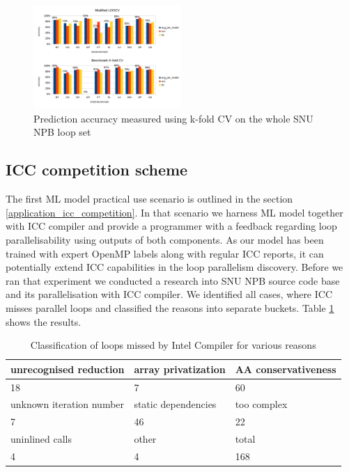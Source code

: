 \documentclass[sigconf,10pt,review,anonymous]{acmart}
\begin{document}
\begin{figure}[h]
\includegraphics[width=0.5\textwidth]{figures/LOOCV_accuracy.pdf}
\caption{Prediction accuracy measured using k-fold CV on the whole SNU NPB loop set}
\label{fig:accuracy}
\end{figure}

\subsection{ICC competition scheme}
\label{evaluation_icc_competition}
\quad The first ML model practical use scenario is outlined in the section \ref{application_icc_competition}. In that scenario we harness ML model together with ICC compiler and provide a programmer with a feedback regarding loop parallelisability using outputs of both components. As our model has been trained with expert OpenMP labels along with regular ICC reports, it can potentially extend ICC capabilities in the loop parallelism discovery.\newline\null
\quad Before we ran that experiment we conducted a research into SNU NPB source code base and its parallelisation with ICC compiler. We identified all cases, where ICC misses parallel loops and classified the reasons into separate buckets. Table \ref{tab:icc_missed_opportunities} shows the results.

\begin{table}[h!]
    \centering
    \begin{tabular}[c]{|p{2cm}|p{2cm}|p{2cm}|}
        \hline
        unrecognised reduction & array privatization & AA conservativeness \\
        \hline
        18 & 7 & 60 \\
        \hline
        unknown iteration number & static dependencies & too complex \\
        \hline
        7 & 46 & 22 \\
        \hline
        uninlined calls & other & total \\
        \hline
        4 & 4 & 168   \\
        \hline
    \end{tabular}
    \caption{Classification of loops missed by Intel Compiler for various reasons}
    \label{tab:icc_missed_opportunities}
\end{table}
\end{document}
